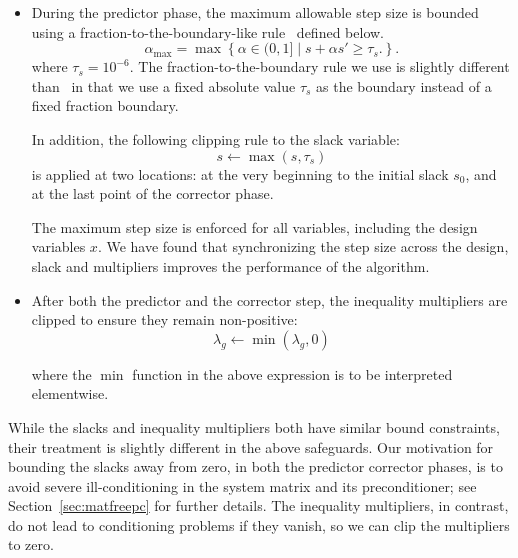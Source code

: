\begin{itemize}
  \item During the predictor phase, the maximum allowable step size is bounded
    using a fraction-to-the-boundary-like rule~\cite{Nocedal2006NO} defined
    below.
  \begin{equation}\label{eq:f2b}
      \alpha_{\max} = \max\left\{
      \alpha \in (0,1] \;|\; s + \alpha s' \geq \tau_s .\right\}.
    \end{equation}
where $\tau_s = 10^{-6}$. The fraction-to-the-boundary rule we use is slightly 
different than~\cite{Nocedal2006NO} in that we use a fixed absolute value $\tau_s$ as the boundary 
instead of a fixed fraction boundary. 



In addition, the following clipping rule to the slack variable: 
\begin{equation}\label{eq:sclip}
    s \leftarrow \max(s, \tau_s)
\end{equation}
is applied at two locations: at the very beginning to the initial 
slack $s_0$, and at the last point of the corrector phase. 

    The maximum step size is enforced for all variables, including the design
    variables $x$.  We have found that synchronizing the step size across the
    design, slack and multipliers improves the performance of the algorithm.
    
  \item After both the predictor and the corrector step,
  the inequality multipliers are clipped to
    ensure they remain non-positive:
    \begin{equation}\label{eq:lclip}
     \lambda_g \leftarrow \min(\lambda_g, 0)
    \end{equation}

    where the $\min$ function in the above expression is to be
    interpreted elementwise.  
\end{itemize}

While the slacks and inequality multipliers both have similar bound constraints, their treatment is
slightly different in the above safeguards.  Our motivation for bounding the
slacks away from zero, in both the predictor corrector phases, is to avoid
severe ill-conditioning in the system matrix and its preconditioner; see
Section~\ref{sec:matfreepc} for further details.  The inequality multipliers, in contrast,
do not lead to conditioning problems if they vanish, so we can clip the
multipliers to zero.

